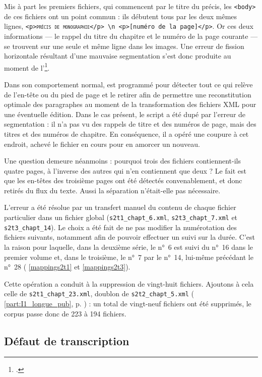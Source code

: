 Mis à part les premiers fichiers, qui commencent par le titre du précis, les \texttt{<body>} de ces fichiers ont un point commun : ils débutent tous par les deux mêmes lignes, \texttt{<p>\textsc{précis de monographie}</p> \textbackslash n <p>[numéro de la page]</p>}. Or ces deux informations --- le rappel du titre du chapitre et le numéro de la page courante --- se trouvent sur une seule et même ligne dans les images. Une erreur de fission horizontale résultant d'une mauvaise segmentation s'est donc produite au moment de l'\ocr\footcite[p. 5-6]{karpinski}.

Dans son comportement normal, \lse{} est programmé pour détecter tout ce qui relève de l'en-tête ou du pied de page et le retirer afin de permettre une reconstitution optimale des paragraphes au moment de la transformation des fichiers XML pour une éventuelle édition. Dans le cas présent, le script a été dupé par l'erreur de segmentation : il n'a pas vu des rappels de titre et des numéros de page, mais des titres et des numéros de chapitre. En conséquence, il a opéré une coupure à cet endroit, \cad{} achevé le fichier en cours pour en amorcer un nouveau.

Une question demeure néanmoins : pourquoi trois des fichiers contiennent-ils quatre pages, à l'inverse des autres qui n'en contiennent que deux ? Le fait est que les en-têtes des troisième pages ont été détectés convenablement, et donc retirés du flux du texte. Aussi la séparation n'était-elle pas nécessaire.

L'erreur a été résolue par un transfert manuel du contenu de chaque fichier particulier dans un fichier global (\texttt{s2t1\_chapt\_6.xml}, \texttt{s2t3\_chapt\_7.xml} et \texttt{s2t3\_chapt\_14}). Le choix a été fait de ne pas modifier la numérotation des fichiers suivants, notamment afin de pouvoir effectuer un suivi sur la durée. C'est la raison pour laquelle, dans la deuxième série, le n°~6 est suivi du n°~16 dans le premier volume et, dans le troisième, le  n°~7 par le n°~14, lui-même précédant le n°~28 (\ann{} \ref{mappings2t1} et \ref{mappings2t3}).

Cette opération a conduit à la suppression de vingt-huit fichiers. Ajoutons à cela celle de \texttt{s2t1\_chapt\_23.xml}, doublon de \texttt{s2t2\_chapt\_5.xml} (\cf{} \ref{part:I1_longue_pub}, p. \pageref{part:I1_longue_pub}) : un total de vingt-neuf fichiers ont été supprimés, le corpus passe donc de 223 à 194 fichiers.

\subsection{Défaut de transcription}

